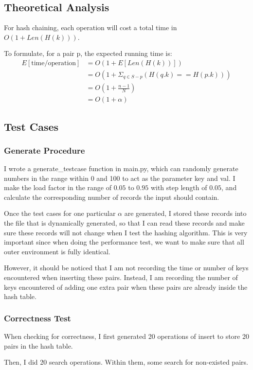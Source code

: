 \documentclass{article}
\begin{document}
\begin{spacing}{1.2}
\subsection{Theoretical Analysis}
For hash chaining, each operation will cost a total time in $O(1 + Len(H(k)))$.

To formulate, for a pair p, the expected running time is:
\begin{align*}
    E[\text{time/operation}] &= O(1 + E[Len(H(k))])\\
    &= O(1 + \Sigma_{q \in S - p}(H(q.k) == H(p.k)))\\
    &= O(1 + \frac{n-1}{N})\\
    &= O(1 + \alpha)
\end{align*}

\subsection{Test Cases}
\subsubsection{Generate Procedure}
I wrote a generate\_testcase function in main.py, which can randomly generate numbers in the range within 0 and 100 to act as the parameter key and val. I make the load factor in the range of $0.05$ to $0.95$ with step length of $0.05$, and calculate the corresponding number of records the input should contain.

Once the test cases for one particular $\alpha$ are generated, I stored these records into the file that is dynamically generated, so that I can read these records and make sure these records will not change when I test the hashing algorithm. This is very important since when doing the performance test, we want to make sure that all outer environment is fully identical.

However, it should be noticed that I am not recording the time or number of keys encountered when inserting these pairs. Instead, I am recording the number of keys encountered of adding one extra pair when these pairs are already inside the hash table. 

\subsubsection{Correctness Test}
When checking for correctness, I first generated 20 operations of insert to store 20 pairs in the hash table.

Then, I did 20 search operations. Within them, some search for non-existed pairs.


\end{spacing}
\end{document}
